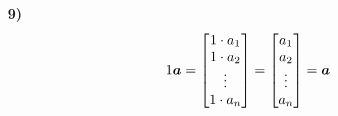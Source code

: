 \begin{problem}
\begin{solution}
\begin{enumerate}
			\item[\textbf{9)}]
			$$
			\begin{aligned}
				1 \boldsymbol{a} = \begin{bmatrix} 1 \cdot a_1 \\ 1 \cdot a_2 \\ \vdots \\ 1 \cdot a_n \end{bmatrix}
				= \begin{bmatrix} a_1 \\ a_2 \\ \vdots \\ a_n \end{bmatrix}
				= \boldsymbol{a}
			\end{aligned}
			$$
		\end{enumerate}
	\end{solution}
\end{problem}
